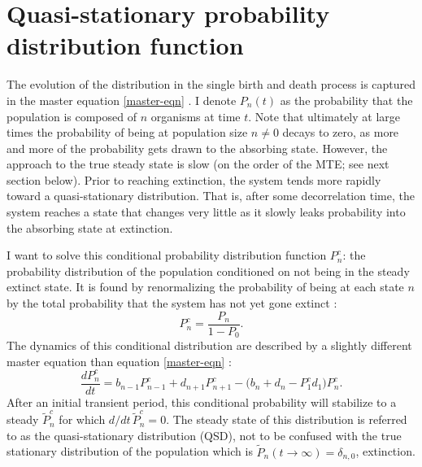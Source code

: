 \section{Quasi-stationary probability distribution function}%

The evolution of the distribution in the single birth and death process is captured in the master equation \ref{master-eqn} \cite{Nisbet1982,Gardiner2004a}. 
I denote $P_n(t)$ as the probability that the population is composed of $n$ organisms at time $t$.
Note that ultimately at large times the probability of being at population size $n\neq 0$ decays to zero, as more and more of the probability gets drawn to the absorbing state. 
However, the approach to the true steady state is slow (on the order of the MTE; see next section below). 
Prior to reaching extinction, the system tends more rapidly toward a quasi-stationary distribution. 
That is, after some decorrelation time, the system reaches a state that changes very little as it slowly leaks probability into the absorbing state at extinction. 

I want to solve this conditional probability distribution function $P_n^c$: the probability distribution of the population conditioned on not being in the steady extinct state. 
It is found by renormalizing the probability of being at each state $n$ by the total probability that the system has not yet gone extinct \cite{Nisbet1982}:
\begin{equation*}
 P_n^c = \frac{P_n}{1-P_0}.
\end{equation*}
The dynamics of this conditional distribution are described by a slightly different master equation than equation \ref{master-eqn} \cite{Nisbet1982}:
\begin{equation}
\frac{dP_n^c}{dt} =  b_{n-1}P_{n-1}^c + d_{n+1}P_{n+1}^c - \big(b_n + d_n - P_1^c d_1 \big) P_n^c. 
\label{masters2}
\end{equation}
After an initial transient period, this conditional probability will stabilize to a steady $\tilde{P}^c_n$ for which $d/dt\,\tilde{P}_n^c=0$. 
The steady state of this distribution is referred to as the quasi-stationary distribution (QSD), not to be confused with the true stationary distribution of the population which is $\tilde{P}_n(t\rightarrow\infty)=\delta_{n,0}$, extinction. 

